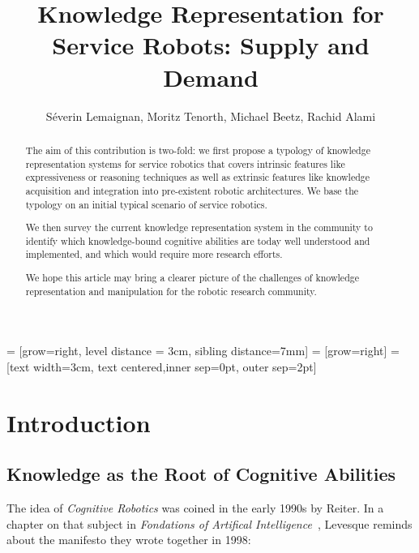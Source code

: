 \documentclass[a4paper, twocolumn]{article}
\title{Knowledge Representation for Service Robots: Supply and Demand}
\author{Séverin Lemaignan, Moritz Tenorth, Michael Beetz, Rachid Alami}
\begin{document}
 = [grow=right, level distance = 3cm, sibling distance=7mm]
 = [grow=right]
 = [text width=3cm, text centered,inner sep=0pt, outer sep=2pt] %

\maketitle
\tableofcontents


\begin{abstract}

The aim of this contribution is two-fold: we first propose a typology of
knowledge representation systems for service robotics that covers intrinsic
features like expressiveness or reasoning techniques as well as extrinsic
features like knowledge acquisition and integration into pre-existent robotic
architectures. We base the typology on an initial typical scenario of service
robotics.

We then survey the current knowledge representation system in the community to
identify which knowledge-bound cognitive abilities are today well understood
and implemented, and which would require more research efforts.

We hope this article may bring a clearer picture of the challenges of knowledge
representation and manipulation for the robotic research community.

\end{abstract}

\section{Introduction}
\label{sect|intro}

\subsection{Knowledge as the Root of Cognitive Abilities}
\label{sect|cognitive-abilities}

The idea of \emph{Cognitive Robotics} was coined in the early 1990s by Reiter.
In a chapter on that subject in \emph{Fondations of Artifical
Intelligence}~\cite{Levesque2008}, Levesque reminds about the manifesto they
wrote together in 1998:
\end{document}
